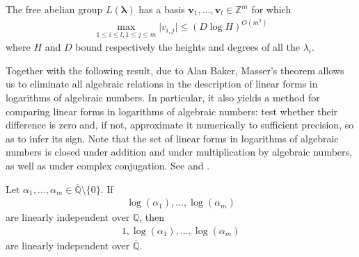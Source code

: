 \begin{theorem}[Masser]
The free abelian group $L(\boldsymbol{\lambda})$ has a basis $\boldsymbol{v}_{1}, \ldots, \boldsymbol{v}_{l} \in \mathbb{Z}^{m}$ for which
\begin{align*}
\max\limits_{1 \leq i \leq l, 1 \leq j \leq m} \lvert v_{i,j} \rvert \leq (D \log H)^{O(m^{2})}
\end{align*}
where $H$ and $D$ bound respectively the heights and degrees of all the $\lambda_{i}$.
\end{theorem}


Together with the following result, due to Alan Baker, Masser's theorem allows us to eliminate all algebraic relations in the description of linear forms in logarithms of algebraic numbers. In particular, it also yields a method for comparing linear forms in logarithms of algebraic numbers: test whether their difference is zero and, if not, approximate it numerically to sufficient precision, so as to infer its sign. Note that the set of linear forms in logarithms of algebraic numbers is closed under addition and under multiplication by algebraic numbers, as well as under complex conjugation. See \cite{Baker75} and \cite{BakerPaper}.

\begin{theorem}[Baker]
Let $\alpha_{1}, \ldots, \alpha_{m} \in \overline{\mathbb{Q}} \setminus \lbrace 0 \rbrace$. If
\begin{align*}
\log(\alpha_{1}), \ldots, \log(\alpha_{m})
\end{align*}
are linearly independent over $\mathbb{Q}$, then
\begin{align*}
1, \log(\alpha_{1}), \ldots, \log(\alpha_{m})
\end{align*}
are linearly independent over $\overline{\mathbb{Q}}$.
\end{theorem}


